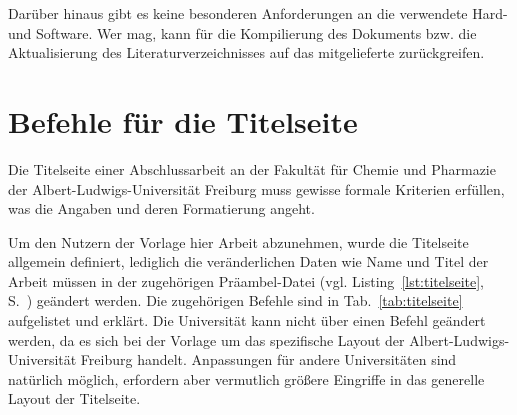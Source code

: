 Darüber hinaus gibt es keine besonderen Anforderungen an die verwendete Hard- und Software. Wer mag, kann für die Kompilierung des Dokuments bzw. die Aktualisierung des Literaturverzeichnisses auf das mitgelieferte  zurückgreifen.


\section{Befehle für die Titelseite}

Die Titelseite einer Abschlussarbeit an der Fakultät für Chemie und Pharmazie der Albert-Ludwigs-Universität Freiburg muss gewisse formale Kriterien erfüllen, was die Angaben und deren Formatierung angeht.

Um den Nutzern der Vorlage hier Arbeit abzunehmen, wurde die Titelseite allgemein definiert, lediglich die veränderlichen Daten wie Name und Titel der Arbeit müssen in der zugehörigen Präambel-Datei  (vgl. Listing~\ref{lst:titelseite}, S.~\pageref{lst:titelseite}) geändert werden. Die zugehörigen Befehle sind in Tab.~\ref{tab:titelseite} aufgelistet und erklärt. Die Universität kann nicht über einen Befehl geändert werden, da es sich bei der Vorlage um das spezifische Layout der Albert-Ludwigs-Universität Freiburg handelt. Anpassungen für andere Universitäten sind natürlich möglich, erfordern aber vermutlich größere Eingriffe in das generelle Layout der Titelseite.




